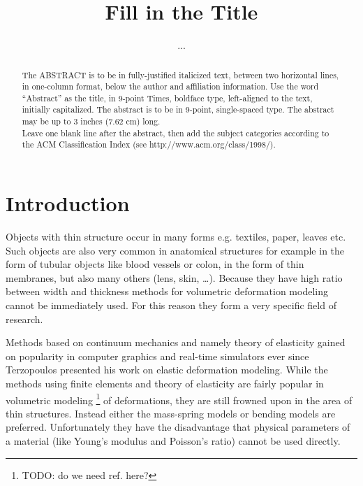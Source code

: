 \documentclass{egpubl}
\title[Short title]%
      {Fill in the Title} %
\author[...]
       {...} %
\begin{document}

\maketitle

\begin{abstract} %
   The ABSTRACT is to be in fully-justified italicized text, 
   between two horizontal lines,
   in one-column format, 
   below the author and affiliation information. 
   Use the word ``Abstract'' as the title, in 9-point Times, boldface type, 
   left-aligned to the text, initially capitalized. 
   The abstract is to be in 9-point, single-spaced type.
   The abstract may be up to 3 inches (7.62 cm) long. \\
   Leave one blank line after the abstract, 
   then add the subject categories according to the ACM Classification Index 
   (see http://www.acm.org/class/1998/).

\begin{classification} %
\end{classification}

\end{abstract}






\section{Introduction} %

Objects with thin structure occur in many forms e.g. textiles, paper,
leaves etc. Such objects are also very common in anatomical structures for
example in the form of tubular objects like blood vessels or colon, in the
form of thin membranes, but also many others (lens, skin, \ldots). Because
they have high ratio between width and thickness methods for volumetric
deformation modeling cannot be immediately used. For this reason they form
a very specific field of research.

Methods based on continuum mechanics and namely theory of elasticity gained
on popularity in computer graphics and real-time simulators ever since
Terzopoulos \cite{Terzopoulos1987} presented his work on elastic
deformation modeling. While the methods using finite elements and theory of
elasticity are fairly popular in volumetric modeling \footnote{TODO: do we
need ref. here?} of deformations, they are still frowned upon in the area
of thin structures. Instead either the mass-spring models \cite{Volino2009}
or bending models \cite{Grinspun2003,Choi2007} are preferred. Unfortunately
they have the disadvantage that physical parameters of a material (like
Young's modulus and Poisson's ratio) cannot be used directly.
\end{document}
